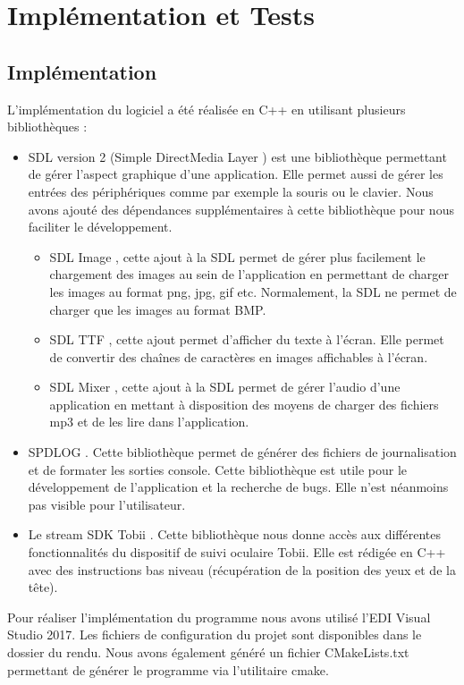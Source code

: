 \documentclass{polytech/polytech}
\begin{document}
\chapter{Implémentation et Tests}
\section{Implémentation}
L'implémentation du logiciel a été réalisée en C++ en utilisant plusieurs bibliothèques :
\begin{itemize}
\item SDL version 2 (Simple DirectMedia Layer \cite{sdl2}) est une bibliothèque permettant de gérer l'aspect graphique d'une application. Elle permet aussi de gérer les entrées des périphériques comme par exemple la souris ou le clavier. Nous avons ajouté des dépendances supplémentaires à cette bibliothèque pour nous faciliter le développement. 
\begin{itemize}
\item SDL Image \cite{sdl2_image}, cette ajout à la SDL permet de gérer plus facilement le chargement des images au sein de l'application en permettant de charger les images au format png, jpg, gif etc. Normalement, la SDL ne permet de charger que les images au format BMP.
\item SDL TTF \cite{sdl2_ttf}, cette ajout permet d'afficher du texte à l'écran. Elle permet de convertir des chaînes de caractères en images affichables à l'écran. 
\item SDL Mixer \cite{sdl2_mixer}, cette ajout à la SDL permet de gérer l'audio d'une application en mettant à disposition des moyens de charger des fichiers mp3 et de les lire dans l'application.
\end{itemize}
\item SPDLOG \cite{spdlog}. Cette bibliothèque permet de générer des fichiers de journalisation et de formater les sorties console. Cette bibliothèque est utile pour le développement de l'application et la recherche de bugs. Elle n'est néanmoins pas visible pour l'utilisateur. 
\item Le stream SDK Tobii \cite{tobiiApi}. Cette bibliothèque nous donne accès aux différentes fonctionnalités du dispositif de suivi oculaire Tobii. Elle est rédigée en C++ avec des instructions bas niveau (récupération de la position des yeux et de la tête).
\end{itemize}

Pour réaliser l'implémentation du programme nous avons utilisé l'EDI Visual Studio 2017. Les fichiers de configuration du projet sont disponibles dans le dossier du rendu. Nous avons également généré un fichier CMakeLists.txt permettant de générer le programme via l'utilitaire cmake. 
\end{document}
